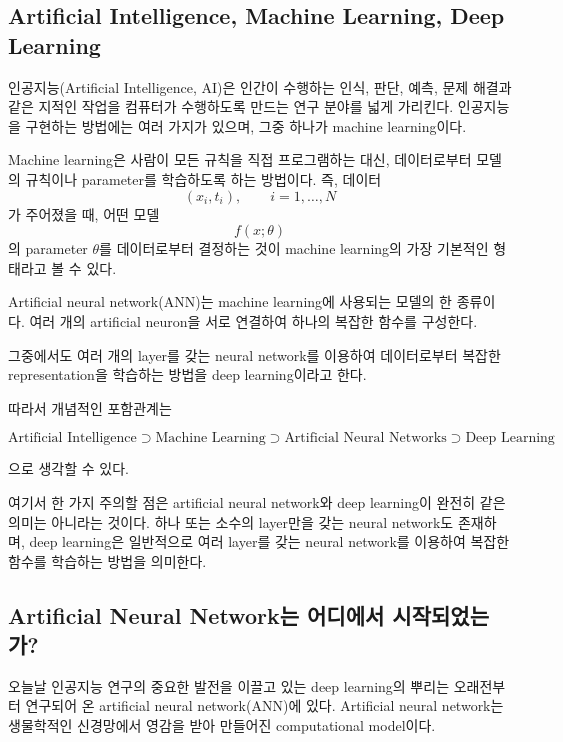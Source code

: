 \documentclass[11pt,a4paper]{article}
\begin{document}

\subsection*{Artificial Intelligence, Machine Learning, Deep Learning}

인공지능(Artificial Intelligence, AI)은 인간이 수행하는 인식, 판단, 예측,
문제 해결과 같은 지적인 작업을 컴퓨터가 수행하도록 만드는 연구 분야를 넓게 가리킨다.
인공지능을 구현하는 방법에는 여러 가지가 있으며, 그중 하나가
machine learning이다.

Machine learning은 사람이 모든 규칙을 직접 프로그램하는 대신,
데이터로부터 모델의 규칙이나 parameter를 학습하도록 하는 방법이다.
즉, 데이터
\[
(x_i,t_i),\qquad i=1,\ldots,N
\]
가 주어졌을 때, 어떤 모델
\[
f(x;\theta)
\]
의 parameter $\theta$를 데이터로부터 결정하는 것이 machine learning의
가장 기본적인 형태라고 볼 수 있다.

Artificial neural network(ANN)는 machine learning에 사용되는 모델의 한 종류이다.
여러 개의 artificial neuron을 서로 연결하여 하나의 복잡한 함수를 구성한다.

그중에서도 여러 개의 layer를 갖는 neural network를 이용하여
데이터로부터 복잡한 representation을 학습하는 방법을
deep learning이라고 한다.

따라서 개념적인 포함관계는

\[
\boxed{
\text{Artificial Intelligence}
\supset
\text{Machine Learning}
\supset
\text{Artificial Neural Networks}
\supset
\text{Deep Learning}
}
\]

으로 생각할 수 있다.

여기서 한 가지 주의할 점은 artificial neural network와 deep learning이
완전히 같은 의미는 아니라는 것이다.
하나 또는 소수의 layer만을 갖는 neural network도 존재하며,
deep learning은 일반적으로 여러 layer를 갖는 neural network를 이용하여
복잡한 함수를 학습하는 방법을 의미한다.

\subsection*{Artificial Neural Network는 어디에서 시작되었는가?}

오늘날 인공지능 연구의 중요한 발전을 이끌고 있는 deep learning의 뿌리는
오래전부터 연구되어 온 artificial neural network(ANN)에 있다.
Artificial neural network는 생물학적인 신경망에서 영감을 받아 만들어진
computational model이다.
\end{document}
